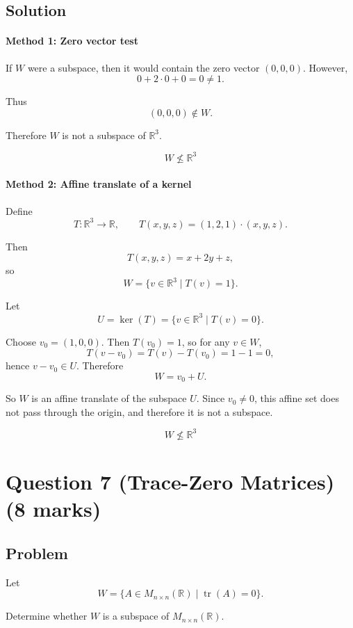 \documentclass[12pt]{article}
\begin{document}
\subsection{Solution}

\paragraph{Method 1: Zero vector test}

If \(W\) were a subspace, then it would contain the zero vector \((0,0,0)\). However,
\[
0+2\cdot 0+0=0\neq1.
\]

Thus
\[
(0,0,0)\notin W.
\]

Therefore \(W\) is not a subspace of \(\mathbb R^3\).

\[
\boxed{W\not\le \mathbb R^3}
\]

\paragraph{Method 2: Affine translate of a kernel}

Define
\[
T:\mathbb R^3\to\mathbb R,\qquad T(x,y,z)=(1,2,1)\cdot(x,y,z).
\]

Then
\[
T(x,y,z)=x+2y+z,
\]
so
\[
W=\{v\in\mathbb R^3\mid T(v)=1\}.
\]

Let
\[
U=\ker(T)=\{v\in\mathbb R^3\mid T(v)=0\}.
\]

Choose \(v_0=(1,0,0)\). Then \(T(v_0)=1\), so for any \(v\in W\),
\[
T(v-v_0)=T(v)-T(v_0)=1-1=0,
\]
hence \(v-v_0\in U\). Therefore
\[
W=v_0+U.
\]

So \(W\) is an affine translate of the subspace \(U\). Since \(v_0\neq0\), this affine set does not pass through the origin, and therefore it is not a subspace.

\[
\boxed{W\not\le \mathbb R^3}
\]

\newpage
\section{Question 7 (Trace-Zero Matrices) \hfill (8 marks)}
\subsection{Problem}

Let
\[
W=\{A\in M_{n\times n}(\mathbb R)\mid \operatorname{tr}(A)=0\}.
\]

Determine whether \(W\) is a subspace of \(M_{n\times n}(\mathbb R)\).
\end{document}

